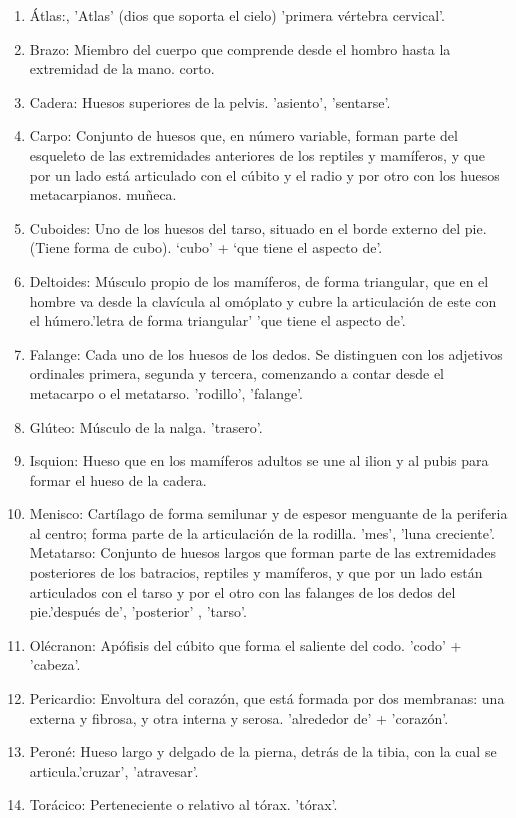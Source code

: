 \documentclass{mylib/reporte}
\begin{document}
\begin{enumerate}
	\item Átlas:, 'Atlas' (dios que soporta el cielo) 'primera vértebra cervical'.
	\item Brazo:   Miembro del cuerpo que comprende desde el hombro hasta la extremidad de la mano. corto.
	\item Cadera: Huesos superiores de la pelvis. 'asiento', 'sentarse'.
	\item Carpo: Conjunto de huesos que, en número variable, forman parte del esqueleto de las extremidades anteriores de los reptiles y mamíferos, y que por un lado está articulado con el cúbito y el radio y por otro con los huesos metacarpianos. muñeca.
	\item Cuboides: Uno de los huesos del tarso, situado en el borde externo del pie. (Tiene forma de cubo). ‘cubo’ + ‘que tiene el aspecto de’.
	\item Deltoides: Músculo propio de los mamíferos, de forma triangular, que en el hombre va desde la clavícula al omóplato y cubre la articulación de este con el húmero.'letra  de forma triangular' 'que tiene el aspecto de'.
	\item Falange: Cada uno de los huesos de los dedos. Se distinguen con los adjetivos ordinales primera, segunda y tercera, comenzando a contar desde el metacarpo o el metatarso. 'rodillo', 'falange'.
	\item Glúteo: Músculo de la nalga. 'trasero'.
	\item Isquion: Hueso que en los mamíferos adultos se une al ilion y al pubis para formar el hueso de la cadera.
	\item Menisco: Cartílago de forma semilunar y de espesor menguante de la periferia al centro; forma parte de la articulación de la rodilla. 'mes', 'luna creciente'. Metatarso: Conjunto de huesos largos que forman parte de las extremidades posteriores de los batracios, reptiles y mamíferos, y que por un lado están articulados con el tarso y por el otro con las falanges de los dedos del pie.'después de', 'posterior' , 'tarso'.
	\item Olécranon: Apófisis del cúbito que forma el saliente del codo. 'codo' + 'cabeza'.
	\item Pericardio: Envoltura del corazón, que está formada por dos membranas: una externa y fibrosa, y otra interna y serosa.  'alrededor de' + 'corazón'.
	\item Peroné: Hueso largo y delgado de la pierna, detrás de la tibia, con la cual se articula.'cruzar', 'atravesar'.
	\item Torácico: Perteneciente o relativo al tórax. 'tórax'.

\end{enumerate}
\end{document}
